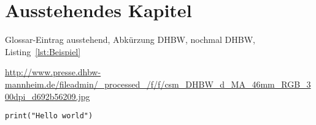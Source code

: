 \section{Ausstehendes Kapitel}

Glossar\hyp{}Eintrag \gls{ausstehend}, Abkürzung \ac{DHBW}, nochmal \ac{DHBW}, Listing~\ref{lst:Beispiel}

\begin{sloppypar}
\url{http://www.presse.dhbw-mannheim.de/fileadmin/_processed_/f/f/csm_DHBW_d_MA_46mm_RGB_300dpi_d692b56209.jpg} %
\end{sloppypar}

\begin{lstlisting}
print("Hello world")
\end{lstlisting}
